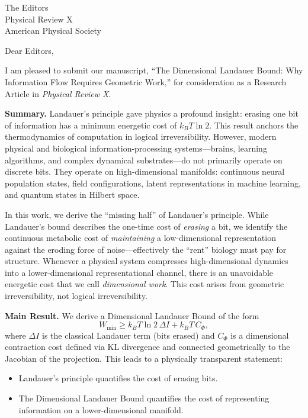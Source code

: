 \documentclass[11pt]{letter}
\begin{document}
\begin{letter}{The Editors\\Physical Review X\\American Physical Society}

\opening{Dear Editors,}

I am pleased to submit our manuscript, ``The Dimensional Landauer Bound: Why Information Flow Requires Geometric Work,'' for consideration as a Research Article in \textit{Physical Review X}.

\textbf{Summary.} Landauer's principle gave physics a profound insight: erasing one bit of information has a minimum energetic cost of $k_B T \ln 2$. This result anchors the thermodynamics of computation in logical irreversibility. However, modern physical and biological information-processing systems---brains, learning algorithms, and complex dynamical substrates---do not primarily operate on discrete bits. They operate on high-dimensional manifolds: continuous neural population states, field configurations, latent representations in machine learning, and quantum states in Hilbert space.

In this work, we derive the ``missing half'' of Landauer's principle. While Landauer's bound describes the one-time cost of \textit{erasing} a bit, we identify the continuous metabolic cost of \textit{maintaining} a low-dimensional representation against the eroding force of noise---effectively the ``rent'' biology must pay for structure. Whenever a physical system compresses high-dimensional dynamics into a lower-dimensional representational channel, there is an unavoidable energetic cost that we call \textit{dimensional work}. This cost arises from geometric irreversibility, not logical irreversibility.

\textbf{Main Result.} We derive a Dimensional Landauer Bound of the form
\[
W_{\min} \ge k_B T \ln 2\, \Delta I + k_B T\, C_\Phi,
\]
where $\Delta I$ is the classical Landauer term (bits erased) and $C_\Phi$ is a dimensional contraction cost defined via KL divergence and connected geometrically to the Jacobian of the projection. This leads to a physically transparent statement:
\begin{itemize}
\item Landauer's principle quantifies the cost of erasing bits.
\item The Dimensional Landauer Bound quantifies the cost of representing information on a lower-dimensional manifold.
\end{itemize}


\end{letter}
\end{document}
